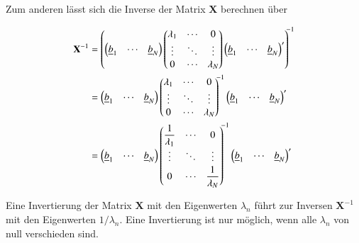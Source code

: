 \noindent Zum anderen l\"{a}sst sich die Inverse der Matrix \textbf{X} berechnen \"{u}ber 

\begin{equation}\label{eq:thirteenonehundredthirty}
\begin{split}
\mathbf{X}^{-1} 
&= \left(
\begin{pmatrix} 
    \ub_{1} & \cdots & \ub_{N} 
\end{pmatrix}
\begin{pmatrix} 
    \lambda_{1} & \cdots & 0 \\ 
    \vdots & \ddots & \vdots \\ 
    0 & \cdots & \lambda_{N} 
\end{pmatrix}
\begin{pmatrix} 
    \ub_{1} & \cdots & \ub_{N} 
\end{pmatrix}' 
\right)^{\!\!-1}  \\ %
&= 
\begin{pmatrix} 
    \ub_{1} & \cdots & \ub_{N} 
\end{pmatrix}
\begin{pmatrix} 
    \lambda_{1} & \cdots & 0 \\ 
    \vdots & \ddots & \vdots \\ 
    0 & \cdots & \lambda_{N} 
\end{pmatrix}^{\!\!-1}
\begin{pmatrix} 
    \ub_{1} & \cdots & \ub_{N} 
\end{pmatrix}'\\ %
&= 
\begin{pmatrix} 
    \ub_{1} & \cdots & \ub_{N} 
\end{pmatrix}
\begin{pmatrix} 
    \dfrac{1}{\lambda_{1}} & \cdots & 0 \\ 
    \vdots & \ddots & \vdots \\ 0 & 
    \cdots & \dfrac{1^{\mathstrut}}{\lambda_{N}} 
\end{pmatrix}^{\!\!-1}
\begin{pmatrix} 
    \ub_{1} & \cdots & \ub_{N} 
\end{pmatrix}'\\ %
\end{split}
\end{equation}

\noindent Eine Invertierung der Matrix $\mathbf{X}$ mit den Eigenwerten $\lambda_{n}$ f\"{u}hrt zur Inversen $\mathbf{X}^{-1}$ mit den Eigenwerten $1/\lambda_{n}$. Eine Invertierung ist nur m\"{o}glich, wenn alle $\lambda_{n}$ von null verschieden sind. \bigskip

